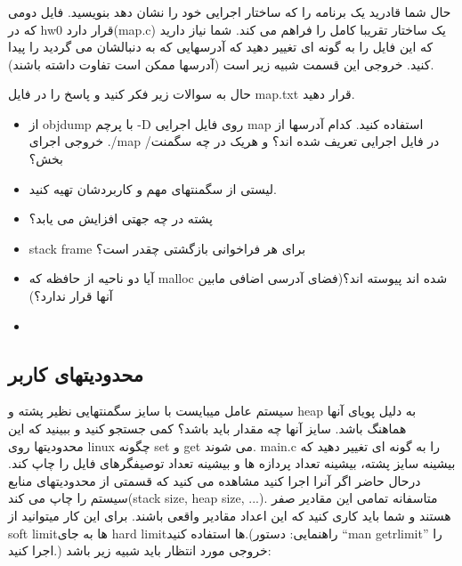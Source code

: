 \subsubsection{
}
حال شما قادرید یک برنامه را که ساختار اجرایی خود را نشان دهد بنویسید. فایل دومی که در hw0 قرار دارد(map.c) یک ساختار تقریبا کامل را فراهم می کند. شما نیاز دارید که این فایل را به گونه ای تغییر دهید که آدرسهایی که به دنبالشان می گردید را پیدا کنید. خروجی این قسمت شبیه زیر است (آدرسها ممکن است تفاوت داشته باشند).
\begin{flushleft}
\end{flushleft}

حال به سوالات زیر فکر کنید و پاسخ را در فایل map.txt قرار دهید.
\begin{itemize}
\item
از objdump با پرچم -D روی فایل اجرایی map استفاده کنید. کدام آدرسها از خروجی اجرای ./map در فایل اجرایی تعریف شده اند؟ و هریک در چه سگمنت/بخش؟
\item
لیستی از سگمنتهای مهم و کاربردشان تهیه کنید.
\item
پشته در چه جهتی افزایش می یابد؟
\item
stack frame برای هر فراخوانی بازگشتی چقدر است؟
\item
آیا دو ناحیه از حافظه که malloc شده اند پیوسته اند؟(فضای آدرسی اضافی مابین آنها قرار ندارد؟)
\item
\end{itemize}

\subsection{محدودیتهای کاربر}
سیستم عامل میبایست با سایز سگمنتهایی نظیر پشته و heap به دلیل پویای آنها هماهنگ باشد. سایز آنها چه مقدار باید باشد؟ کمی جستجو کنید و ببینید که این محدودیتها روی linux چگونه set و get می شوند.
main.c را به گونه ای تغییر دهید که بیشینه سایز پشته، بیشینه تعداد پردازه ها و بیشینه تعداد توصیفگرهای فایل را چاپ کند. درحال حاضر اگر آنرا اجرا کنید مشاهده می کنید که قسمتی از محدودیتهای منابع سیستم را چاپ می کند(stack size, heap size, ...). متاسفانه تمامی این مقادیر صفر هستند و شما باید کاری کنید که این اعداد مقادیر واقعی باشند. برای این کار میتوانید از soft limitها به جای hard limitها استفاده کنید.(راهنمایی: دستور “man getrlimit” را اجرا کنید.)
خروجی مورد انتظار باید شبیه زیر باشد:
\begin{flushleft}
\end{flushleft}